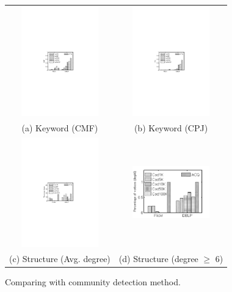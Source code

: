 \begin{figure}[]
\centering
    \begin{tabular}{c c}
        \begin{minipage}{3.36cm}
	        \includegraphics[width=3.35cm]{figures/cmfCOD}
        \end{minipage}
        &
        \begin{minipage}{3.36cm}
	     \includegraphics[width=3.35cm]{figures/cpjCOD}
         \end{minipage}
         \\
         \small (a) Keyword (CMF)
         &
         \small (b) Keyword (CPJ)
         \\

        \begin{minipage}{3.36cm}
	       \includegraphics[width=3.35cm]{figures/avgDegCOD}
        \end{minipage}
        &
        \begin{minipage}{3.36cm}
	       \includegraphics[width=3.35cm]{figures/deg6COD}
        \end{minipage}
        \\
        \small (c) Structure (Avg. degree)
        &
        \small (d) Structure (degree $\geq$ 6)
    \end{tabular}
    \caption{Comparing with community detection method.}
    \label{fig:detection-comp}
\end{figure}


